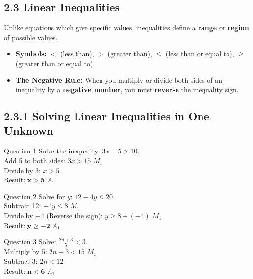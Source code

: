 \documentclass[12pt, a4paper, oneside]{article}
\begin{document}
\subsection*{2.3 Linear Inequalities}

\begin{tcolorbox}[colback=lightgrey, colframe=primaryblue, title=\textbf{Teacher's Concept: Understanding Regions}, arc=5pt]
    Unlike equations which give specific values, inequalities define a \textbf{range} or \textbf{region} of possible values.
    \begin{itemize}
        \item \textbf{Symbols:} $<$ (less than), $>$ (greater than), $\leq$ (less than or equal to), $\geq$ (greater than or equal to).
        \item \textbf{The Negative Rule:} When you multiply or divide both sides of an inequality by a \textbf{negative number}, you must \textbf{reverse} the inequality sign.
    \end{itemize}
\end{tcolorbox}

\subsection*{2.3.1 Solving Linear Inequalities in One Unknown}

\begin{solvingbox}{Question 1}
Solve the inequality: $3x - 5 > 10$. \\
Add 5 to both sides: $3x > 15$ \hfill $M_1$ \\
Divide by 3: $x > 5$ \\
Result: $\mathbf{x > 5}$ \hfill $A_1$
\end{solvingbox}

\begin{solvingbox}{Question 2}
Solve for $y$: $12 - 4y \leq 20$. \\
Subtract 12: $-4y \leq 8$ \hfill $M_1$ \\
Divide by $-4$ (Reverse the sign): $y \geq 8 \div (-4)$ \hfill $M_1$ \\
Result: $\mathbf{y \geq -2}$ \hfill $A_1$
\end{solvingbox}

\begin{solvingbox}{Question 3}
Solve: $\frac{2n + 3}{5} < 3$. \\
Multiply by 5: $2n + 3 < 15$ \hfill $M_1$ \\
Subtract 3: $2n < 12$ \\
Result: $\mathbf{n < 6}$ \hfill $A_1$
\end{solvingbox}
\end{document}

